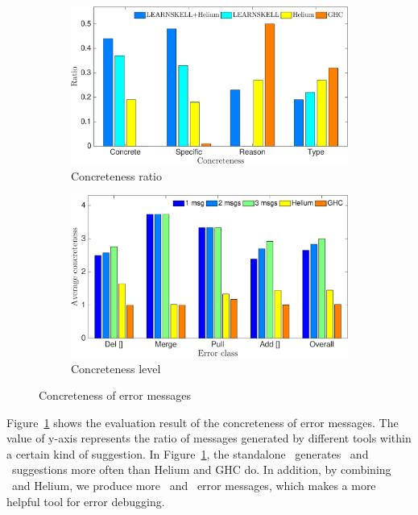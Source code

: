 \documentclass[12pt]{report}	%
\begin{document}
\begin{figure}
\centering
\begin{subfigure}[t]{0.85\textwidth}
	\centering
    \includegraphics[width=.95\linewidth]{images/concrete_ratio.eps}
    \caption{Concreteness ratio}
     \label{fig:sub6a}
\end{subfigure}

\begin{subfigure}[t]{0.85\textwidth}
	\centering
    \includegraphics[width=.95\linewidth]{images/concrete.eps}
    \caption{Concreteness level}
    \label{fig:sub6b}
\end{subfigure}
\caption{Concreteness of error messages}
\label{fig:Concrete}
\end{figure}

Figure~\ref{fig:sub6a} shows the evaluation result of the concreteness of error messages.
The value of y-axis represents 
the ratio of messages generated by different tools within a certain kind of suggestion.
In Figure~\ref{fig:sub6a},
the standalone \newCompiler\  generates \correct\
and \concrete\ suggestions more often
than Helium and GHC do.
In addition, by combining \newCompiler\ and Helium, 
we produce more \correct\ and \concrete\ error messages, 
which makes a more helpful tool for error debugging.
\end{document}
